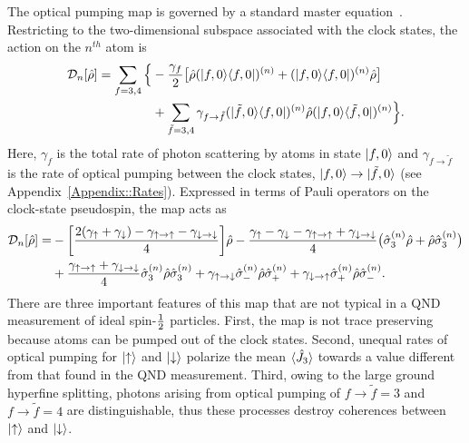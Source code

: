 \documentclass[preprint, aps,pra,onecolumn]{revtex4-1} %
\newcommand{\half}{\smallfrac{1}{2}}
\newcommand{\jz}{\hat{J}_3}
\newcommand{\gammauu}{\gamma_{\uparrow \rightarrow \uparrow}}
\newcommand{\gammadd}{\gamma_{\downarrow \rightarrow \downarrow}}
\newcommand{\gammaud}{\gamma_{\uparrow \rightarrow \downarrow}}
\newcommand{\gammadu}{\gamma_{\downarrow \rightarrow \uparrow}}
\newcommand{\gammau}{\gamma_{\uparrow}}
\newcommand{\gammad}{\gamma_{\downarrow}}
\begin{document}
The optical pumping map is governed by a standard master equation~\cite{deutsch_quantum_2010}.  
Restricting to the two-dimensional subspace associated with the clock states, the action on the $n^{th}$ atom is
	\begin{align}
		\mathcal{D}_n[\hat{\rho}] =  \sum_{f=3,4} \Big\{& -\frac{\gamma_{f}}{2} \big[ \hat{\rho} (\lvert{f,0}\rangle\langle{f,0}\rvert)^{(n)} + (\lvert{f,0}\rangle\langle{f,0}\rvert)^{(n)}\hat{\rho} \big]\\
		&+  \sum_{\tilde{f} =3,4}  \gamma_{f \rightarrow \tilde{f}}(\lvert{\tilde{f},0}\rangle\langle{f,0}\rvert)^{(n)} \hat{\rho}(\lvert{f,0}\rangle\langle{\tilde{f},0}\rvert)^{(n)} \Big\}.\nonumber
	\end{align}
Here, $\gamma_{f}$ is the total rate of photon scattering by atoms in state $\lvert{f,0}\rangle$ and  $\gamma_{f \rightarrow \tilde{f} }$ is the rate of optical pumping between the clock states, $\lvert{f,0}\rangle \rightarrow \lvert{\tilde{f},0}\rangle$ (see Appendix~\ref{Appendix::Rates}). Expressed in terms of Pauli operators on the clock-state pseudospin, the map acts as
	\begin{align} \label{Eq::OpticalPumpingMapSchr}
		\mathcal{D}_n [\hat{\rho}] 
				=& - \bigg[ \frac{2(\gammau+ \gammad) - \gammauu - \gammadd}{4} \bigg] \hat{\rho} - \frac{ \gammau - \gammad - \gammauu + \gammadd }{4} \big( \hat{\sigma}_3^{(n)} \hat{\rho}+ \hat{\rho} \hat{\sigma}_3^{(n)} \big) \nn \\
		&+ \frac{\gammauu+\gammadd}{4} \hat{\sigma}_ 3^{(n)}\hat{\rho} \hat{\sigma}_3^{(n)} + \gammaud  \hat{\sigma}_-^{(n)} \hat{\rho} \hat{\sigma}_+^{(n)} + \gammadu  \hat{\sigma}_+^{(n)} \hat{\rho} \hat{\sigma}_- ^{(n)}.   
	\end{align} 
There are three important features of this map that are not typical in a QND measurement of ideal spin-$\half$ particles.  
First, the map is not trace preserving because atoms can be pumped out of the clock states. 
Second, unequal rates of optical pumping for $\lvert{\uparrow}\rangle$ and $\lvert{\downarrow}\rangle$ polarize the mean $\expt{\jz}$ towards a value different from that found in the QND measurement. 
Third, owing to the large ground hyperfine splitting, photons arising from optical pumping of $f \rightarrow \tilde{f}=3$ and $f \rightarrow \tilde{f}=4$ are distinguishable, thus these processes destroy coherences between $\lvert{\uparrow}\rangle$ and $\lvert{\downarrow}\rangle$. 
\end{document}
